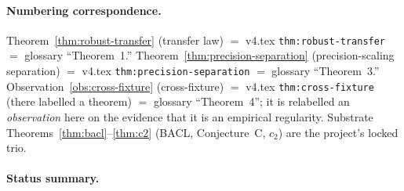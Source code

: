 \documentclass[11pt,a4paper]{article}
\begin{document}
\paragraph{Numbering correspondence.} Theorem~\ref{thm:robust-transfer} (transfer law) $=$ v4.tex \texttt{thm:robust-transfer} $=$ glossary ``Theorem~1.'' Theorem~\ref{thm:precision-separation} (precision-scaling separation) $=$ v4.tex \texttt{thm:precision-separation} $=$ glossary ``Theorem~3.'' Observation~\ref{obs:cross-fixture} (cross-fixture) $=$ v4.tex \texttt{thm:cross-fixture} (there labelled a theorem) $=$ glossary ``Theorem~4''; it is relabelled an \emph{observation} here on the evidence that it is an empirical regularity. Substrate Theorems~\ref{thm:bacl}--\ref{thm:c2} (BACL, Conjecture~C, $c_2$) are the project's locked trio.

\paragraph{Status summary.}
\end{document}
